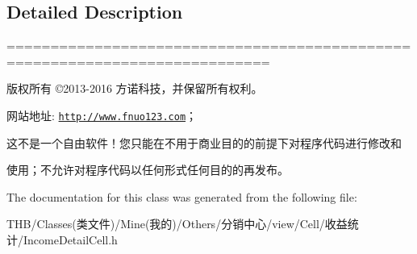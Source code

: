 \subsection{Detailed Description}
============================================================================

版权所有 ©2013-\/2016 方诺科技，并保留所有权利。

网站地址\+: \href{http://www.fnuo123.com}{\tt http\+://www.\+fnuo123.\+com}； 



这不是一个自由软件！您只能在不用于商业目的的前提下对程序代码进行修改和

使用；不允许对程序代码以任何形式任何目的的再发布。 

 

The documentation for this class was generated from the following file\+:\begin{DoxyCompactItemize}
\item 
T\+H\+B/\+Classes(类文件)/\+Mine(我的)/\+Others/分销中心/view/\+Cell/收益统计/Income\+Detail\+Cell.\+h\end{DoxyCompactItemize}
